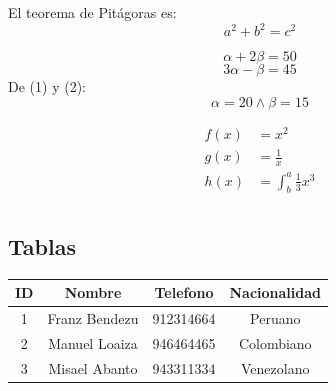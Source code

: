 \documentclass[12pt, letterpaper]{article}
\begin{document}
El teorema de Pitágoras es: $$a^2 + b^2 = c^2$$

\begin{equation}
    \alpha + 2\beta = 50
\end{equation}
\begin{equation}
    3\alpha - \beta = 45
\end{equation}
De (1) y (2):
\begin{equation*}
    \boxed{\alpha = 20 \wedge \beta = 15}
\end{equation*}

\begin{align*}
    f(x) &= x^2\\
    g(x) &= \frac{1}{x}\\
    h(x) &= \int^a_b \frac{1}{3}x^3\\
\end{align*}

\subsection{Tablas}
\begin{center}
    \begin{tabular}{|c|c|c|c|}
        \hline
        \textbf{ID} & \textbf{Nombre} & \textbf{Telefono} & \textbf{Nacionalidad}\\ \hline
        1 & Franz Bendezu & 912314664 & Peruano\\ \hline
        2 & Manuel Loaiza & 946464465 & Colombiano\\ \hline
        3 & Misael Abanto & 943311334 & Venezolano\\ \hline
    \end{tabular}
\end{center}
\end{document}
